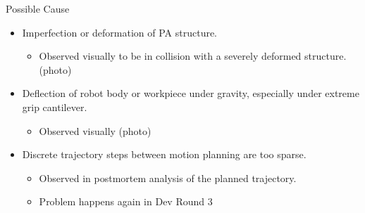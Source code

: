 Possible Cause
\begin{itemize}
    \item Imperfection or deformation of PA structure.
    \begin{itemize}
        \item Observed visually to be in collision with a severely deformed structure. (photo)
    \end{itemize}
    \item Deflection of robot body or workpiece under gravity, especially under extreme grip cantilever. 
    \begin{itemize}
        \item Observed visually (photo)
    \end{itemize}
    \item Discrete trajectory steps between motion planning are too sparse.
    \begin{itemize}
        \item Observed in postmortem analysis of the planned trajectory.
        \item Problem happens again in Dev Round 3
    \end{itemize}
\end{itemize}


